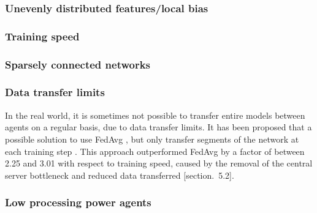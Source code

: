 \subsubsection{Unevenly distributed features/local bias}
\cite{multi_center_fed_learning}
\cite{fedbn}
\cite{model_agnostic_meta_learning}

\subsubsection{Training speed}

\subsubsection{Sparsely connected networks}

\subsubsection{Data transfer limits}
In the real world, it is sometimes not possible to transfer entire models between agents on a regular basis, due to data transfer limits. It has been proposed that a possible solution to use FedAvg \cite{fed_learning}, but only transfer segments of the network at each training step \cite{gossip_learning}. This approach outperformed FedAvg by a factor of between 2.25 and 3.01 with respect to training speed, caused by the removal of the central server bottleneck and reduced data transferred \cite{gossip_learning}[section.~5.2].

\subsubsection{Low processing power agents}
\cite{fed_in_robotics}
